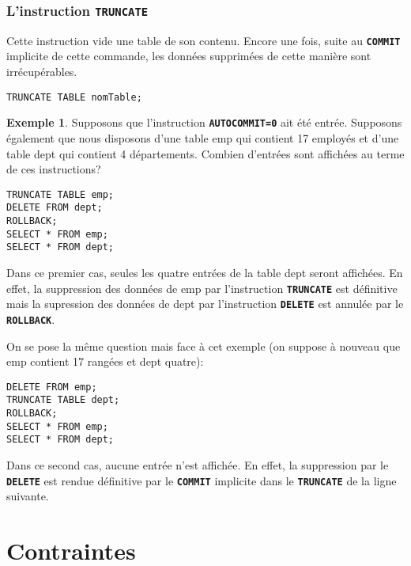 \documentclass[a4paper, 12pt]{report}
\newcommand{\textSQL}[1]{\texttt{\textbf{#1}}}
\theoremstyle{definition} \newtheorem{ex}{Exemple}
\begin{document}
\subsection{L'instruction \textSQL{TRUNCATE}}
Cette instruction vide une table de son contenu. Encore une fois, suite au \textSQL{COMMIT} implicite de cette commande, les données supprimées de cette manière sont irrécupérables.
\begin{lstlisting}[frame=single]
TRUNCATE TABLE nomTable;
\end{lstlisting}

\begin{ex}
Supposons que l'instruction \textSQL{AUTOCOMMIT=0} ait été entrée. Supposons également que nous disposons d'une table emp qui contient 17 employés et d'une table dept qui contient 4 départements. Combien d'entrées sont affichées au terme de ces instructions?
\begin{lstlisting}[frame=single]
TRUNCATE TABLE emp;
DELETE FROM dept;
ROLLBACK;
SELECT * FROM emp;
SELECT * FROM dept;
\end{lstlisting}
Dans ce premier cas, seules les quatre entrées de la table dept seront affichées. En effet, la suppression des données de emp par l'instruction \textSQL{TRUNCATE} est définitive mais la supression des données de dept par l'instruction \textSQL{DELETE} est annulée par le \textSQL{ROLLBACK}.

On se pose la même question mais face à cet exemple (on suppose à nouveau que emp contient 17 rangées et dept quatre):
\begin{lstlisting}[frame=single]
DELETE FROM emp;
TRUNCATE TABLE dept;
ROLLBACK;
SELECT * FROM emp;
SELECT * FROM dept;
\end{lstlisting}
Dans ce second cas, aucune entrée n'est affichée. En effet, la suppression par le \textSQL{DELETE} est rendue définitive par le \textSQL{COMMIT} implicite dans le \textSQL{TRUNCATE} de la ligne suivante.
\end{ex}
\chapter{Contraintes}
\end{document}
